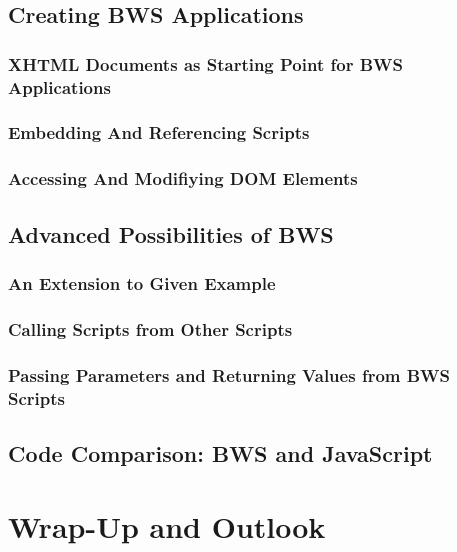  \subsection{Creating BWS Applications}
 
  \subsubsection{XHTML Documents as Starting Point for BWS Applications}

  

  \subsubsection{Embedding And Referencing Scripts}

 

  \subsubsection{Accessing And Modifiying DOM Elements}


 \subsection{Advanced Possibilities of BWS}
  \subsubsection{An Extension to Given Example}
  \subsubsection{Calling Scripts from Other Scripts}
  \subsubsection{Passing Parameters and Returning Values from BWS Scripts}
 \subsection{Code Comparison: BWS and JavaScript}
\section{Wrap-Up and Outlook}